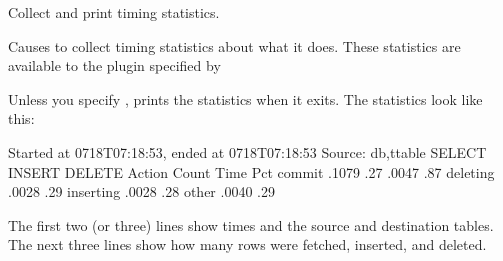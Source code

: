\documentclass[letterpaper,10pt,english]{sphinxmanual}
\begin{document}

\begin{fulllineitems}
\label{\detokenize{mariadb-archiver:cmdoption-mariadb-archiver-statistics}}
Collect and print timing statistics.

Causes  to collect timing statistics about what it does.  These
statistics are available to the plugin specified by {\hyperref[\detokenize{mariadb-archiver:cmdoption-mariadb-archiver-plugin}]{}}

Unless you specify {\hyperref[\detokenize{mariadb-archiver:cmdoption-mariadb-archiver-quiet}]{}},  prints the statistics when it
exits.  The statistics look like this:

\begin{sphinxVerbatim}[commandchars=\\\{\}]
Started at \PYGZhy{}07\PYGZhy{}18T07:18:53, ended at \PYGZhy{}07\PYGZhy{}18T07:18:53
Source: db,ttable
SELECT 
INSERT 
DELETE 
Action         Count       Time        Pct
commit                 .1079      .27
                  .0047       .87
deleting                .0028       .29
inserting               .0028       .28
other                   .0040       .29
\end{sphinxVerbatim}

The first two (or three) lines show times and the source and destination tables.
The next three lines show how many rows were fetched, inserted, and deleted.


\end{fulllineitems}
\end{document}
